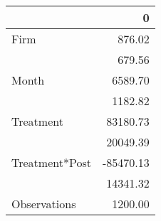 \begin{tabular}{lr}
\toprule
{} &         0 \\
\midrule
Firm           &    876.02 \\
               &    679.56 \\
Month          &   6589.70 \\
               &   1182.82 \\
Treatment      &  83180.73 \\
               &  20049.39 \\
Treatment*Post & -85470.13 \\
               &  14341.32 \\
Observations   &   1200.00 \\
\bottomrule
\end{tabular}
